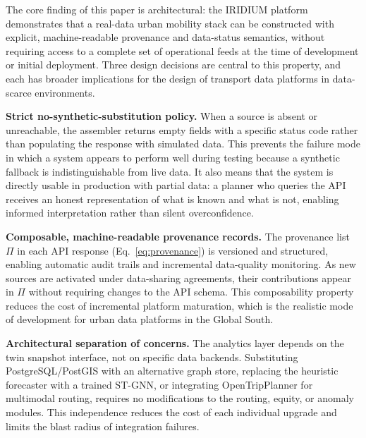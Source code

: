 
The core finding of this paper is architectural: the IRIDIUM platform
demonstrates that a real-data urban mobility stack can be constructed
with explicit, machine-readable provenance and data-status semantics,
without requiring access to a complete set of operational feeds at the
time of development or initial deployment.
Three design decisions are central to this property, and each has
broader implications for the design of transport data platforms in
data-scarce environments.

\textbf{Strict no-synthetic-substitution policy.}
When a source is absent or unreachable, the assembler returns empty
fields with a specific status code rather than populating the response
with simulated data.
This prevents the failure mode in which a system appears to perform well
during testing because a synthetic fallback is indistinguishable from
live data.
It also means that the system is directly usable in production with
partial data: a planner who queries the API receives an honest representation
of what is known and what is not, enabling informed interpretation rather
than silent overconfidence.

\textbf{Composable, machine-readable provenance records.}
The provenance list $\Pi$ in each API response (Eq.~\ref{eq:provenance})
is versioned and structured, enabling automatic audit trails and
incremental data-quality monitoring.
As new sources are activated under data-sharing agreements, their
contributions appear in $\Pi$ without requiring changes to the API schema.
This composability property reduces the cost of incremental platform
maturation, which is the realistic mode of development for urban data
platforms in the Global South.

\textbf{Architectural separation of concerns.}
The analytics layer depends on the twin snapshot interface, not on
specific data backends.
Substituting PostgreSQL/PostGIS with an alternative graph store,
replacing the heuristic forecaster with a trained ST-GNN, or integrating
OpenTripPlanner for multimodal routing, requires no modifications to
the routing, equity, or anomaly modules.
This independence reduces the cost of each individual upgrade and limits
the blast radius of integration failures.

